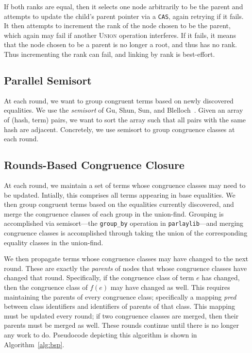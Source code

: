 If both ranks are equal, then it selects one node arbitrarily to be the parent
and attempts to update the child's parent pointer via a \texttt{CAS}, again
retrying if it fails. It then attempts to increment the rank of the node chosen
to be the parent, which again may fail if another \textsc{Union} operation
interferes. If it fails, it means that the node chosen to be a parent is no
longer a root, and thus has no rank. Thus incrementing the rank can fail, and
linking by rank is best-effort.

\subsection{Parallel Semisort}
\label{subsec:semisort}

At each round, we want to group congruent terms based on newly discovered
equalities. We use the \emph{semisort} of Gu, Shun, Sun, and
Blelloch~\cite{semisort}. Given an array of (hash, term) pairs, we want to sort
the array such that all pairs with the same hash are adjacent. Concretely, we
use semisort to group congruence classes at each round.

\subsection{Rounds-Based Congruence Closure}
\label{subsec:rounds}

At each round, we maintain a set of terms whose congruence classes may need to
be updated. Intially, this comprises all terms appearing in base equalities. We
then group congruent terms based on the equalities currently discovered, and
merge the congruence classes of each group in the union-find. Grouping is
accomplished via semisort---the \texttt{group\_by} operation in
\texttt{parlaylib}---and merging congruence classes is accomplished through
taking the union of the corresponding equality classes in the union-find.

We then propagate terms whose congruence classes may have changed to the next
round. These are exactly the \emph{parents} of nodes that whose congruence
classes have changed that round. Specifically, if the congruence class of term
$e$ has changed, then the congruence class of $f(e)$ may have changed as well.
This requires maintaining the parents of every congruence class; specifically a
mapping \textit{pred} between class identifiers and identifiers of parents of
that class. This mapping must be updated every round; if two congruence classes
are merged, then their parents must be merged as well. These rounds continue
until there is no longer any work to do. Pseudocode depicting this algorithm is
shown in Algorithm~\ref{alg:bsp}.


